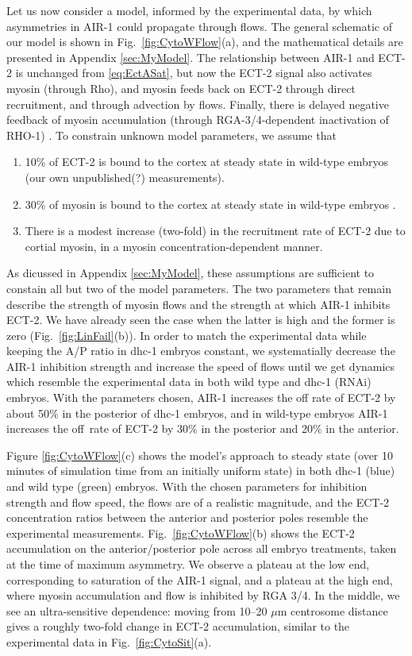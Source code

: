 \documentclass[11pt]{article}
\begin{document}
Let us now consider a model, informed by the experimental data, by which asymmetries in AIR-1 could propagate through flows. The general schematic of our model is shown in Fig.\ \ref{fig:CytoWFlow}(a), and the mathematical details are presented in Appendix \ref{sec:MyModel}. The relationship between AIR-1 and ECT-2 is unchanged from \eqref{eq:EctASat}, but now the ECT-2 signal also activates myosin (through Rho), and myosin feeds back on ECT-2 through direct recruitment, and through advection by flows. Finally, there is delayed negative feedback of myosin accumulation (through RGA-3/4-dependent inactivation of RHO-1) \citep{michaux2018excitable}. To constrain unknown model parameters, we assume that 
\begin{enumerate}
\item 10\% of ECT-2 is bound to the cortex at steady state in wild-type embryos (our own unpublished(?) measurements). 
\item 30\% of myosin is bound to the cortex at steady state in wild-type embryos \citep[Fig.~S3j]{gross2019guiding}.
\item There is a modest increase (two-fold) in the recruitment rate of ECT-2 due to cortial myosin, in a myosin concentration-dependent manner.
\end{enumerate}
As dicussed in Appendix \ref{sec:MyModel}, these assumptions are sufficient to constain all but two of the model parameters. The two parameters that remain describe the strength of myosin flows and the strength at which AIR-1 inhibits ECT-2. We have already seen the case when the latter is high and the former is zero (Fig.\ \ref{fig:LinFail}(b)). In order to match the experimental data while keeping the A/P ratio in dhc-1 embryos constant, we systematially decrease the AIR-1 inhibition strength and increase the speed of flows until we get dynamics which resemble the experimental data in both wild type and dhc-1 (RNAi) embryos. With the parameters chosen, AIR-1 increases the off rate of ECT-2 by about 50\% in the posterior of dhc-1 embryos, and in wild-type embryos AIR-1 increases the off~rate of ECT-2 by 30\% in the posterior and 20\% in the anterior.

Figure \ref{fig:CytoWFlow}(c) shows the model's approach to steady state (over 10 minutes of simulation time from an initially uniform state) in both dhc-1 (blue) and wild type (green) embryos. With the chosen parameters for inhibition strength and flow speed, the flows are of a realistic magnitude, and the ECT-2 concentration ratios between the anterior and posterior poles resemble the experimental measurements. Fig.\ \ref{fig:CytoWFlow}(b) shows the ECT-2 accumulation on the anterior/posterior pole across all embryo treatments, taken at the time of maximum asymmetry. We observe a plateau at the low end, corresponding to saturation of the AIR-1 signal, and a plateau at the high end, where myosin accumulation and flow is inhibited by RGA 3/4. In the middle, we see an ultra-sensitive dependence: moving from 10--20 $\mu$m centrosome distance gives a roughly two-fold change in ECT-2 accumulation, similar to the experimental data in Fig.\ \ref{fig:CytoSit}(a). 
\end{document}
